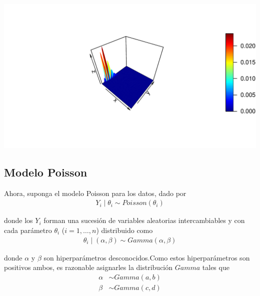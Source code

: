 \documentclass[10pt,openright]{book}\usepackage[]{graphicx}\usepackage[]{color}
\makeatletter
\def\maxwidth{ %
  \ifdim\Gin@nat@width>\linewidth
    \linewidth
  \else
    \Gin@nat@width
  \fi
}
\newenvironment{knitrout}{}{} %
\makeatother
\begin{document}
\begin{knitrout}
\includegraphics[width=\maxwidth]{figure/unnamed-chunk-70-2} 

\end{knitrout}



\subsection{Modelo Poisson}
Ahora, suponga el modelo Poisson para los datos, dado por 
\begin{align*}
Y_i \mid \theta_i \sim Poisson(\theta_i)
\end{align*}

donde los $Y_i$ forman una sucesi\'on de variables aleatorias intercambiables y con cada par\'ametro $\theta_i$ ($i=1,\ldots,n$) distribuido como
\begin{align*}
\theta_i \mid (\alpha,\beta) \sim Gamma(\alpha,\beta)
\end{align*}

donde $\alpha$ y $\beta$ son hiperpar\'ametros desconocidos.Como estos hiperpar\'ametros son positivos ambos, es razonable asignarles la distribuci\'on $Gamma$ tales que
\begin{align*}
\alpha &\sim Gamma(a,b)\\
\beta &\sim Gamma(c,d)
\end{align*}
\end{document}
